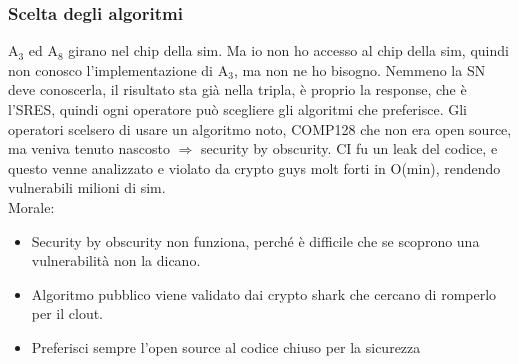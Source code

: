 \documentclass[16px]{article}
\begin{document}
\subsubsection{Scelta degli algoritmi}
A$_{3}$ ed A$_{8}$ girano nel chip della sim. Ma io non ho accesso al chip della sim, quindi non conosco l'implementazione di A$_{3}$, ma non ne ho bisogno. Nemmeno la SN deve conoscerla, il risultato sta già nella tripla, è proprio la response, che è l'SRES, quindi ogni operatore può scegliere gli algoritmi che preferisce. Gli operatori scelsero di usare un algoritmo noto, COMP128 che non era open source, ma veniva tenuto nascosto $\Rightarrow$ security by obscurity. CI fu un leak del codice, e questo venne analizzato e violato da crypto guys molt forti in O(min), rendendo vulnerabili milioni di sim.\\ Morale:
\begin{itemize}
\item Security by obscurity non funziona, perché è difficile che se scoprono una vulnerabilità non la dicano.
\item Algoritmo pubblico viene validato dai crypto shark che cercano di romperlo per il clout.
\item Preferisci sempre l'open source al codice chiuso per la sicurezza
\end{itemize}
\end{document}
